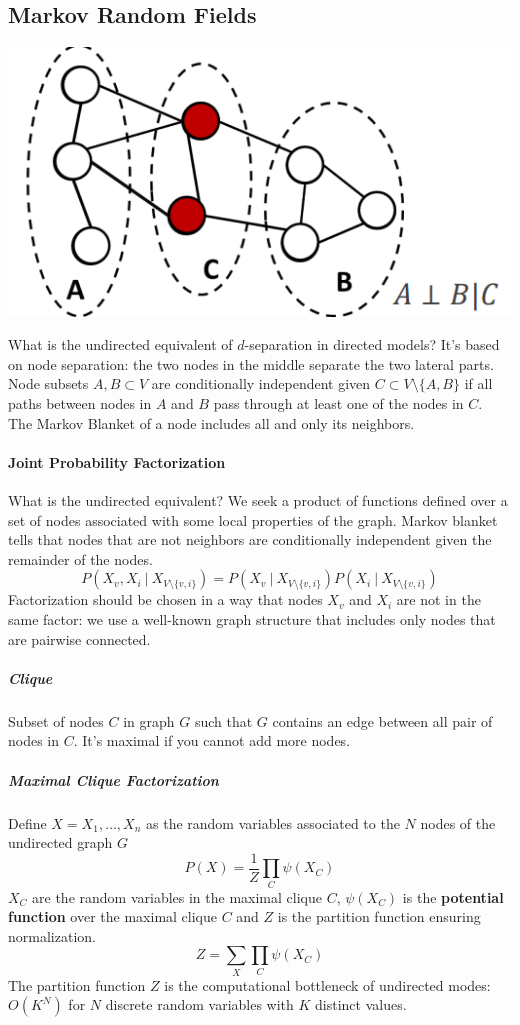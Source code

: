 \documentclass[10pt]{report}
\begin{document}
\subsection{Markov Random Fields}\begin{center}
	\includegraphics[scale=0.5]{24.png}
\end{center}
What is the undirected equivalent of $d$-separation in directed models? It's based on node separation: the two nodes in the middle separate the two lateral parts.\\
Node subsets $A,B\subset V$ are conditionally independent given $C\subset V\setminus \{A,B\}$ if all paths between nodes in $A$ and $B$ pass through at least one of the nodes in $C$.\\
The Markov Blanket of a node includes all and only its neighbors.
\paragraph{Joint Probability Factorization} What is the undirected equivalent? We seek a product of functions defined over a set of nodes associated with some local properties of the graph. Markov blanket tells that nodes that are not neighbors are conditionally independent given the remainder of the nodes.$$P(X_v,X_i\:|\:X_{V\setminus\{v,i\}}) = P(X_v\:|\:X_{V\setminus\{v,i\}})P(X_i\:|\:X_{V\setminus\{v,i\}})$$
Factorization should be chosen in a way that nodes $X_v$ and $X_i$ are not in the same factor: we use a well-known graph structure that includes only nodes that are pairwise connected.
\subparagraph{Clique} Subset of nodes $C$ in graph $G$ such that $G$ contains an edge between all pair of nodes in $C$. It's maximal if you cannot add more nodes.
\subparagraph{Maximal Clique Factorization} Define $X = X_1,\ldots,X_n$ as the random variables associated to the $N$ nodes of the undirected graph $G$ $$P(X)=\frac{1}{Z}\prod_C \psi(X_C)$$
$X_C$ are the random variables in the maximal clique $C$, $\psi(X_C)$ is the \textbf{potential function} over the maximal clique $C$ and $Z$ is the partition function ensuring normalization.
$$Z = \sum_X\prod_C\psi(X_C)$$
The partition function $Z$ is the computational bottleneck of undirected modes: $O(K^N)$ for $N$ discrete random variables with $K$ distinct values.
\end{document}
